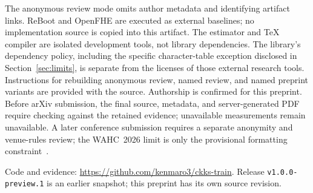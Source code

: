 The anonymous review mode omits author metadata and identifying artifact links. ReBoot and OpenFHE are executed as external baselines; no implementation source is copied into this artifact. The estimator and TeX compiler are isolated development tools, not library dependencies. The library's dependency policy, including the specific character-table exception disclosed in Section~\ref{sec:limits}, is separate from the licenses of those external research tools. Instructions for rebuilding anonymous review, named review, and named preprint variants are provided with the source. Authorship is confirmed for this preprint. Before arXiv submission, the final source, metadata, and server-generated PDF require checking against the retained evidence; unavailable measurements remain unavailable. A later conference submission requires a separate anonymity and venue-rules review; the WAHC~2026 limit is only the provisional formatting constraint~\cite{wahc2026}.

\ifdefined\ArxivDraft
Code and evidence: \url{https://github.com/kenmaro3/ckks-train}. Release \texttt{v1.0.0-preview.1} is an earlier snapshot; this preprint has its own source revision.
\fi
